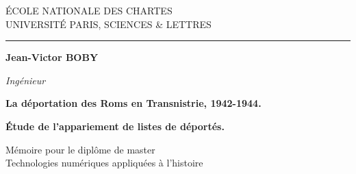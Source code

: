 \documentclass[a4paper,12pt,twoside]{book}
\begin{document}
	
	\begin{titlepage}
		\begin{center}
			
			\bigskip
			
			\begin{large}				
				ÉCOLE NATIONALE DES CHARTES\\
				UNIVERSITÉ PARIS, SCIENCES \& LETTRES
			\end{large}
			\begin{center}\rule{2cm}{0.02cm}\end{center}
			
			\bigskip
			\bigskip
			\bigskip
			\begin{Large}
				\textbf{Jean-Victor BOBY}\\
			\end{Large}
			\begin{normalsize} \textit{Ingénieur}\\
			\end{normalsize}
			
			\bigskip
			\bigskip
			\bigskip
			
			\begin{Huge}
				\textbf{La déportation des Roms en Transnistrie, 1942-1944.}\\
			\end{Huge}
			\bigskip
			\bigskip
			\begin{LARGE}
				\textbf{Étude de l'appariement de listes de déportés.}\\
			\end{LARGE}
			
			\bigskip
			\bigskip
			\bigskip
			\vfill
			
			\begin{large}
				Mémoire 
				pour le diplôme de master \\
				\og{} Technologies numériques appliquées à l'histoire \fg{} \\
			\end{large}
			
		\end{center}
	\end{titlepage}

	\pagestyle{empty}	
	\cleardoublepage
	
	\frontmatter
	\pagestyle{plain}
\end{document}
